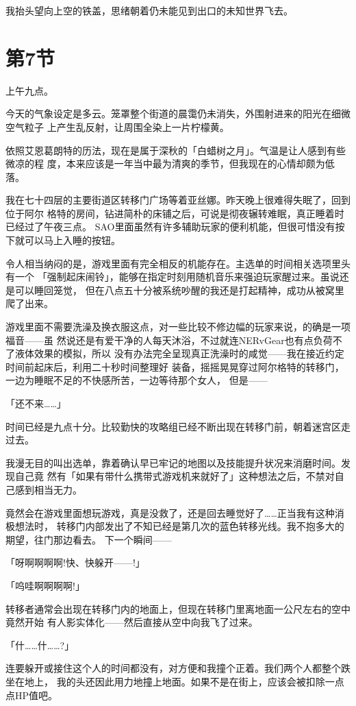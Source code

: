 \documentclass[11pt]{book}
\begin{document}
我抬头望向上空的铁盖，思绪朝着仍未能见到出口的未知世界飞去。
\section{第7节}
\label{sec:orge9495f0}
上午九点。

今天的气象设定是多云。笼罩整个街道的晨霭仍未消失，外围射进来的阳光在细微空气粒子
上产生乱反射，让周围全染上一片柠檬黄。

依照艾恩葛朗特的历法，现在是属于深秋的「白蜡树之月」。气温是让人感到有些微凉的程
度，本来应该是一年当中最为清爽的季节，但我现在的心情却颇为低落。

我在七十四层的主要街道区转移门广场等着亚丝娜。昨天晚上很难得失眠了，回到位于阿尔
格特的房间，钻进简朴的床铺之后，可说是彻夜辗转难眠，真正睡着时已经过了午夜三点。
SAO里面虽然有许多辅助玩家的便利机能，但很可惜没有按下就可以马上入睡的按钮。

令人相当纳闷的是，游戏里面有完全相反的机能存在。主选单的时间相关选项里头有一个
「强制起床闹铃」，能够在指定时刻用随机音乐来强迫玩家醒过来。虽说还是可以睡回笼觉，
但在八点五十分被系统吵醒的我还是打起精神，成功从被窝里爬了出来。

游戏里面不需要洗澡及换衣服这点，对一些比较不修边幅的玩家来说，的确是一项福音——虽
然说还是有爱干净的人每天沐浴，不过就连NERvGear也有点负荷不了液体效果的模拟，所以
没有办法完全呈现真正洗澡时的咸觉——我在接近约定时间前起床后，利用二十秒时间整理好
装备，摇摇晃晃穿过阿尔格特的转移门，一边为睡眠不足的不快感所苦，一边等待那个女人，
但是——

「还不来……」

时间已经是九点十分。比较勤快的攻略组已经不断出现在转移门前，朝着迷宫区走过去。

我漫无目的叫出选单，靠着确认早已牢记的地图以及技能提升状况来消磨时间。发现自己竟
然有「如果有带什么携带式游戏机来就好了」这种想法之后，不禁对自己感到相当无力。

竟然会在游戏里面想玩游戏，真是没救了，还是回去睡觉好了……正当我有这种消极想法时，
转移门内部发出了不知已经是第几次的蓝色转移光线。我不抱多大的期望，往门那边看去。
下一个瞬间——

「呀啊啊啊啊!快、快躲开——!」

「呜哇啊啊啊啊!」

转移者通常会出现在转移门内的地面上，但现在转移门里离地面一公尺左右的空中竟然开始
有人影实体化——然后直接从空中向我飞了过来。

「什……什……?」

连要躲开或接住这个人的时间都没有，对方便和我撞个正着。我们两个人都整个跌坐在地上，
我的头还因此用力地撞上地面。如果不是在街上，应该会被扣除一点点HP值吧。
\end{document}
